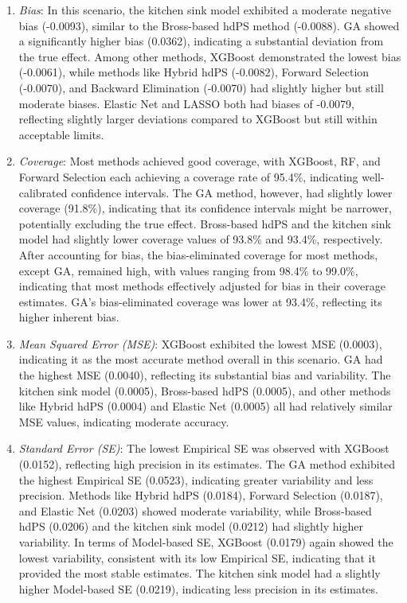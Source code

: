 \documentclass[sn-vancouver,Numbered,lineno,pdflatex]{sn-jnl}
\begin{document}
\begin{enumerate}
\def\labelenumi{\arabic{enumi}.}
\item
  \emph{Bias}: In this scenario, the kitchen sink model exhibited a
  moderate negative bias (-0.0093), similar to the Bross-based hdPS
  method (-0.0088). GA showed a significantly higher bias (0.0362),
  indicating a substantial deviation from the true effect. Among other
  methods, XGBoost demonstrated the lowest bias (-0.0061), while methods
  like Hybrid hdPS (-0.0082), Forward Selection (-0.0070), and Backward
  Elimination (-0.0070) had slightly higher but still moderate biases.
  Elastic Net and LASSO both had biases of -0.0079, reflecting slightly
  larger deviations compared to XGBoost but still within acceptable
  limits.
\item
  \emph{Coverage}: Most methods achieved good coverage, with XGBoost,
  RF, and Forward Selection each achieving a coverage rate of 95.4\%,
  indicating well-calibrated confidence intervals. The GA method,
  however, had slightly lower coverage (91.8\%), indicating that its
  confidence intervals might be narrower, potentially excluding the true
  effect. Bross-based hdPS and the kitchen sink model had slightly lower
  coverage values of 93.8\% and 93.4\%, respectively. After accounting
  for bias, the bias-eliminated coverage for most methods, except GA,
  remained high, with values ranging from 98.4\% to 99.0\%, indicating
  that most methods effectively adjusted for bias in their coverage
  estimates. GA's bias-eliminated coverage was lower at 93.4\%,
  reflecting its higher inherent bias.
\item
  \emph{Mean Squared Error (MSE)}: XGBoost exhibited the lowest MSE
  (0.0003), indicating it as the most accurate method overall in this
  scenario. GA had the highest MSE (0.0040), reflecting its substantial
  bias and variability. The kitchen sink model (0.0005), Bross-based
  hdPS (0.0005), and other methods like Hybrid hdPS (0.0004) and Elastic
  Net (0.0005) all had relatively similar MSE values, indicating
  moderate accuracy.
\item
  \emph{Standard Error (SE)}: The lowest Empirical SE was observed with
  XGBoost (0.0152), reflecting high precision in its estimates. The GA
  method exhibited the highest Empirical SE (0.0523), indicating greater
  variability and less precision. Methods like Hybrid hdPS (0.0184),
  Forward Selection (0.0187), and Elastic Net (0.0203) showed moderate
  variability, while Bross-based hdPS (0.0206) and the kitchen sink
  model (0.0212) had slightly higher variability. In terms of
  Model-based SE, XGBoost (0.0179) again showed the lowest variability,
  consistent with its low Empirical SE, indicating that it provided the
  most stable estimates. The kitchen sink model had a slightly higher
  Model-based SE (0.0219), indicating less precision in its estimates.
\end{enumerate}
\end{document}
